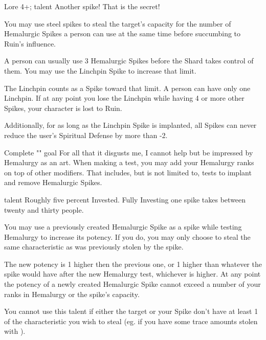 \talent
	{\talentCreateLinchpinName{}}
	{Lore 4+; \talentSpikeRuinousName{} talent}
	{\iconConstant}
	{Another spike! That is the secret!}
	{
		You may use steel spikes to steal the target's capacity for the number of Hemalurgic Spikes a person can use at the same time before succumbing to Ruin's influence. 
		
		A person can usually use 3 Hemalurgic Spikes before the Shard takes control of them. You may use the Linchpin Spike to increase that limit. 
		
		The Linchpin counts as a Spike toward that limit. A person can have only one Linchpin. If at any point you lose the Linchpin while having 4 or more other Spikes, your character is lost to Ruin.
		
		Additionally, for as long as the Linchpin Spike is implanted, all Spikes can never reduce the user's Spiritual Defense by more than -2.
	}	
	
\talent
	{\talentHemalurgyMedicineName{}}
	{Complete "\goalLearnHemalurgyName{}" goal}
	{\iconConstant}
	{For all that it disgusts me, I cannot help but be impressed by Hemalurgy as an art.}
	{
		When making a \skillMedicine{} test, you may add your Hemalurgy ranks on top of other modifiers. That includes, but is not limited to, \skillMedicine{} tests to implant and remove Hemalurgic Spikes.
	}
	
\talent
	{\talentSpikeStackingName{}}
	{\talentHemalurgyMedicineName{} talent}
	{\iconConstant}
	{Roughly five percent Invested. Fully Investing one spike takes between twenty and thirty people.}
	{
		You may use a previously created Hemalurgic Spike as a spike while testing Hemalurgy to increase its potency. If you do, you may only choose to steal the same characteristic as was previously stolen by the spike.
		
		The new potency is 1 higher then the previous one, or 1 higher than whatever the spike would have after the new Hemalurgy test, whichever is higher. At any point the potency of a newly created Hemalurgic Spike cannot exceed a number of your ranks in Hemalurgy or the spike's capacity.
		
		
		You cannot use this talent if either the target or your Spike don't have at least 1 of the characteristic you wish to steal (eg. if you have some trace amounts stolen with \talentStealTraceName{}).
	}


